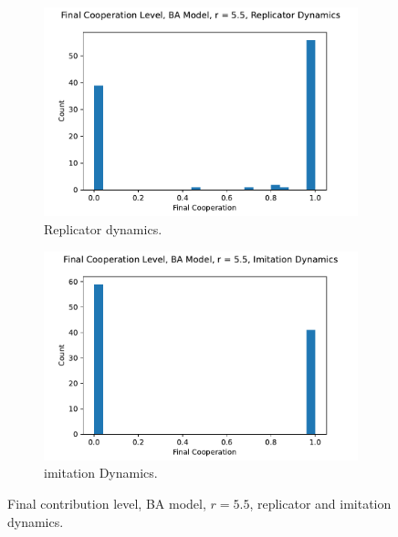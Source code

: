 \FloatBarrier 
\begin{figure}[!h]
  \begin{subfigure}[b]{0.45\textwidth}
    \includegraphics[width=1.1\textwidth]{images/Rep_coop_histo_BA_55.pdf}
    \caption{Replicator dynamics.}
    \label{Rep_BA_55_coop_histo}
  \end{subfigure}
  \hfill
  \begin{subfigure}[b]{0.45\textwidth}
    \includegraphics[width=1.1\textwidth]{images/ID_coop_histo_BA_55.pdf}
    \caption{imitation Dynamics. }
    \label{ID_BA_55_coop_histo}
  \end{subfigure}
  \caption{Final contribution level, BA model, $r = 5.5$, replicator and imitation dynamics. } \label{coop_histo_BA}
\end{figure} 
\FloatBarrier

